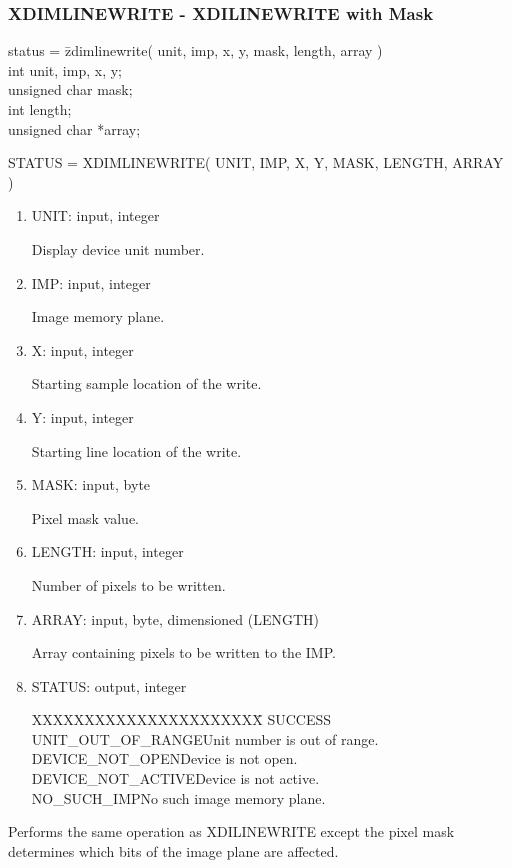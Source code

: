 \subsubsection{XDIMLINEWRITE - XDILINEWRITE with Mask}
\begin{tabbing}
status = \=zdimlinewrite( unit, imp, x, y, mask, length, array )\\
\>int  unit, imp, x, y;\\
\>unsigned char  mask;\\
\>int  length;\\
\>unsigned char  *array;\\
\end{tabbing}
STATUS = XDIMLINEWRITE( UNIT, IMP, X, Y, MASK, LENGTH, ARRAY )
\begin{enumerate}
\item UNIT:  input, integer

Display device unit number.
\item IMP:  input, integer

Image memory plane.
\item X:  input, integer

Starting sample location of the write.
\item Y:  input, integer

Starting line location of the write.
\item MASK:  input, byte

Pixel mask value.
\item LENGTH:  input, integer

Number of pixels to be written.
\item ARRAY:  input, byte, dimensioned (LENGTH)

Array containing pixels to be written to the IMP.
\item STATUS:  output, integer
\begin{tabbing}
XXXXXXXXXXXXXXXXXXXXXX\=\kill
SUCCESS\\
UNIT\_OUT\_OF\_RANGE\>Unit number is out of range.\\
DEVICE\_NOT\_OPEN\>Device is not open.\\
DEVICE\_NOT\_ACTIVE\>Device is not active.\\
NO\_SUCH\_IMP\>No such image memory plane.\\
\end{tabbing}
\end{enumerate}
Performs the same operation as XDILINEWRITE except the pixel mask
determines which bits of the image plane are affected.
\newpage
